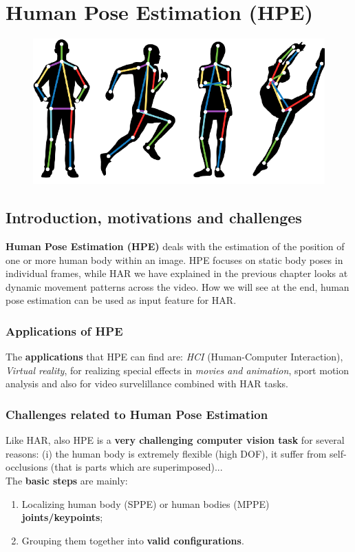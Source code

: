 \chapter{Human Pose Estimation (HPE)}
\vspace{-1cm}
\begin{figure}[h]
    \centering
    \includegraphics[scale=0.7]{img/hpe.png}
\end{figure}

\vspace{-0.5cm}
\section{Introduction, motivations and challenges}
\textbf{Human Pose Estimation (HPE)} deals with the estimation of the position of one or more human body within an image. HPE focuses on static body poses in individual frames, while HAR we have explained in the previous chapter looks at dynamic movement patterns across the video. How we will see at the end, human pose estimation can be used as input feature for HAR.
\vspace{-0.6cm}
\subsection{Applications of HPE}
The \textbf{applications} that HPE can find are: \textit{HCI} (Human-Computer Interaction), \textit{Virtual reality}, for realizing special effects in \textit{movies and animation}, sport motion analysis and also for video survelillance combined with HAR tasks.
\vspace{-0.5cm}
\subsection{Challenges related to Human Pose Estimation}
Like HAR, also HPE is a \textbf{very challenging computer vision task} for several reasons: (i) the human body is extremely flexible (high DOF), it suffer from self-occlusions (that is parts which are superimposed)...\\
\noindent
The \textbf{basic steps} are mainly: 
\begin{enumerate}
    \itemsep-0.3em
    \item Localizing human body (SPPE) or human bodies (MPPE) \textbf{joints/keypoints}; 
    \item Grouping them together into \textbf{valid configurations}.
\end{enumerate}

